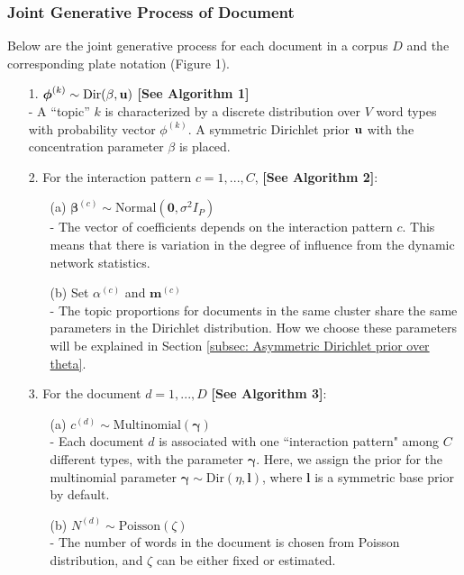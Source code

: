 \documentclass[a4paper]{article}
\begin{document}
\subsubsection{Joint Generative Process of Document} \label{subsubsec: Joint Generative Process of Document}
 Below are the joint generative process for each document in a corpus $D$ and the corresponding plate notation (Figure 1).
\begin{itemize}
	\item[1.] {$\boldsymbol{\phi}^{(k)} \sim \mbox{Dir}(\beta, \bf u)$} \textbf{[See Algorithm 1]}\\
	- A “topic” $k$ is characterized by a discrete distribution over $V$ word types with probability vector $\phi^{(k)}$. A symmetric Dirichlet prior $\bf u$ with the concentration parameter $\beta$ is placed.
	\item[2.] For the interaction pattern $c=1,...,C$,  \textbf{[See Algorithm 2]}: 
		\begin{itemize}
			\item [(a)] $\boldsymbol{\beta}^{(c)}\sim \mbox{Normal}(\textbf{0}, \sigma^2I_P)$ \\
			- The vector of coefficients depends on the interaction pattern $c$. This means that there is variation in the degree of influence from the dynamic network statistics.
			\item [(b)]  Set $\alpha^{(c)}$ and $\boldsymbol{m}^{(c)}$\\
			- The topic proportions for documents in the same cluster share the same parameters in the Dirichlet distribution. How we choose these parameters will be explained in Section \ref{subsec: Asymmetric Dirichlet prior over theta}.
		\end{itemize}
	\item[3.] For the document $d=1,...,D$ \textbf{[See Algorithm 3]}:
	\begin{itemize}
				\item[(a)] $c^{(d)}\sim \mbox{Multinomial}(\boldsymbol{\gamma})$\\
				- Each document $d$ is associated with one ``interaction pattern" among $C$ different types, with the parameter $\boldsymbol{\gamma}$. Here, we assign the prior for the multinomial parameter $\boldsymbol{\gamma} \sim \mbox{Dir}({\eta}, \boldsymbol{l})$, where $\boldsymbol{l}$ is a symmetric base prior by default.
				\item[(b)]  $N^{(d)} \sim \mbox{Poisson}(\zeta)$\\
				- The number of words in the document is chosen from Poisson distribution, and $\zeta$ can be either fixed or estimated.

\end{itemize}
\end{itemize}
\end{document}
